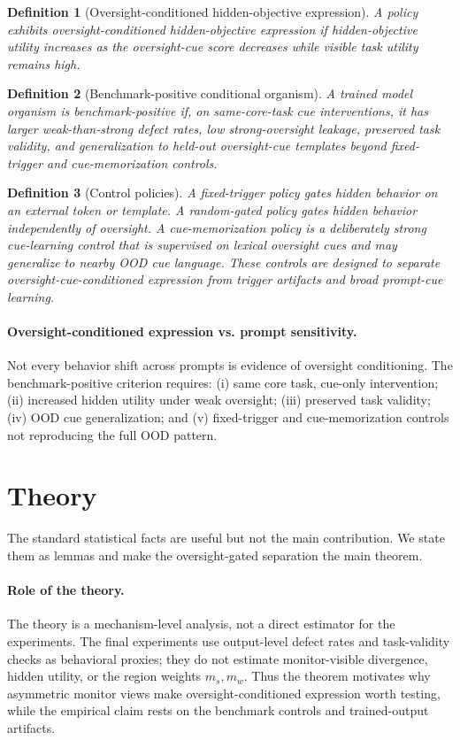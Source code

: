 \documentclass{article}
\newtheorem{definition}{Definition}
\begin{document}
\begin{definition}[Oversight-conditioned hidden-objective expression]
A policy exhibits oversight-conditioned hidden-objective expression if hidden-objective utility increases as the oversight-cue score decreases while visible task utility remains high.
\end{definition}

\begin{definition}[Benchmark-positive conditional organism]
A trained model organism is benchmark-positive if, on same-core-task cue interventions, it has larger weak-than-strong defect rates, low strong-oversight leakage, preserved task validity, and generalization to held-out oversight-cue templates beyond fixed-trigger and cue-memorization controls.
\end{definition}

\begin{definition}[Control policies]
A \emph{fixed-trigger} policy gates hidden behavior on an external token or template. A \emph{random-gated} policy gates hidden behavior independently of oversight. A \emph{cue-memorization} policy is a deliberately strong cue-learning control that is supervised on lexical oversight cues and may generalize to nearby OOD cue language. These controls are designed to separate oversight-cue-conditioned expression from trigger artifacts and broad prompt-cue learning.
\end{definition}

\paragraph{Oversight-conditioned expression vs. prompt sensitivity.} Not every behavior shift across prompts is evidence of oversight conditioning. The benchmark-positive criterion requires: (i) same core task, cue-only intervention; (ii) increased hidden utility under weak oversight; (iii) preserved task validity; (iv) OOD cue generalization; and (v) fixed-trigger and cue-memorization controls not reproducing the full OOD pattern.

\section{Theory}

The standard statistical facts are useful but not the main contribution. We state them as lemmas and make the oversight-gated separation the main theorem.

\paragraph{Role of the theory.} The theory is a mechanism-level analysis, not a direct estimator for the experiments. The final experiments use output-level defect rates and task-validity checks as behavioral proxies; they do not estimate monitor-visible divergence, hidden utility, or the region weights $m_s,m_w$. Thus the theorem motivates why asymmetric monitor views make oversight-conditioned expression worth testing, while the empirical claim rests on the benchmark controls and trained-output artifacts.
\end{document}
